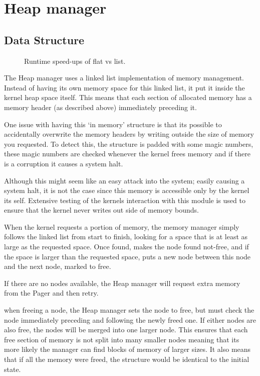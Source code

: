 \documentclass[a4paper]{report}
\begin{document}
\section{Heap manager}

\subsection{Data Structure}

\begin{figure}[ht]
  \centering

  \def\svgwidth{\columnwidth}
  \caption{Runtime speed-ups of flat vs list.}
  \label{fig:schedulerscreen}
\end{figure}

The Heap manager uses a linked list implementation of memory management. Instead of having its own memory space for this linked list, it put it inside the kernel heap space itself. This means that each section of allocated memory has a memory header (as described above) immediately preceding it.

One issue with having this `in memory' structure is that its possible to accidentally overwrite the memory headers by writing outside the size of memory you requested. To detect this, the structure is padded with some magic numbers, these magic numbers are checked whenever the kernel frees memory and if there is a corruption it causes a system halt.

Although this might seem like an easy attack into the system; easily causing a system halt, it is not the case since this memory is accessible only by the kernel its self. Extensive testing of the kernels interaction with this module is used to ensure that the kernel never writes out side of memory bounds.

When the kernel requests a portion of memory, the memory manager simply follows the linked list from start to finish, looking for a space that is at least as large as the requested space. Once found, makes the node found not-free, and if the space is larger than the requested space, puts a new node between this node and the next node, marked to free.

If there are no nodes available, the Heap manager will request extra memory from the Pager and then retry.

when freeing a node, the Heap manager sets the node to free, but must check the node immediately preceding and following the newly freed one. If either nodes are also free, the nodes will be merged into one larger node. This ensures that each free section of memory is not split into many smaller nodes meaning that its more likely the manager can find blocks of memory of larger sizes. It also means that if all the memory were freed, the structure would be identical to the initial state.
\end{document}
